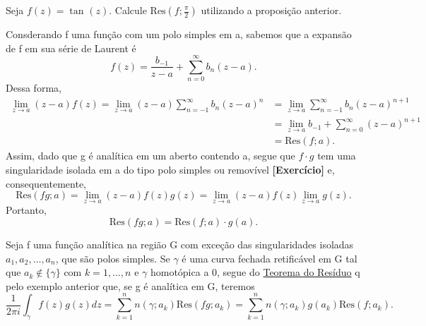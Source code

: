 \documentclass[complex.tex]{subfiles}
\begin{document}
\begin{exer*}
	Seja \(f(z) = \tan^{}{(z)}.\) Calcule \(\mathrm{Res}(f; \frac{\pi }{2})\) utilizando a proposição anterior.
\end{exer*}
\begin{example}
	Consderando f uma função com um polo simples em a, sabemos que a expansão de f em sua série de Laurent é
	\[
		f(z) = \frac{b_{-1}}{z-a} + \sum\limits_{n=0}^{\infty}b_{n}(z-a).
	\]
	Dessa forma,
	\begin{align*}
		\lim_{z\to a}(z-a)f(z) = \lim_{z\to a}(z-a)\sum\limits_{n=-1}^{\infty}b_{n}(z-a)^{n} & = \lim_{z\to a}\sum\limits_{n=-1}^{\infty}b_{n}(z-a)^{n+1}    \\
		                                                                                     & = \lim_{z\to a}b_{-1} + \sum\limits_{n=0}^{\infty}(z-a)^{n+1} \\
		                                                                                     & = \mathrm{Res}(f; a).
	\end{align*}
	Assim, dado que g é analítica em um aberto contendo a, segue que \(f \cdot g\) tem uma singularidade isolada em a do tipo polo simples
	ou removível \textbf{[Exercício]} e, consequentemente,
	\[
		\mathrm{Res}(fg; a) = \lim_{z\to a}(z-a)f(z)g(z) = \lim_{z\to a}(z-a)f(z)\lim_{z\to a}g(z).
	\]
	Portanto,
	\[
		\mathrm{Res}(fg; a) = \mathrm{Res}(f; a)\cdot g(a).
	\]
\end{example}
\begin{example}
	Seja f uma função analítica na região G com exceção das singularidades isoladas \(a_{1}, a_{2}, \dotsc , a_{n}\), que são polos simples.
	Se \(\gamma \) é uma curva fechada retificável em G tal que \(a_{k}\not\in \{\gamma \}\) com \(k=1,\dotsc ,n \) e \(\gamma \) homotópica a 0,
	segue do \hyperlink{residue}{Teorema do Resíduo} q pelo exemplo anterior que, se g é analítica em G, teremos
	\[
		\frac{1}{2\pi i}\int_{\gamma }^{}f(z)g(z)dz = \sum\limits_{k=1}^{n}n(\gamma ; a_{k})\mathrm{Res}(fg; a_{k}) = \sum\limits_{k=1}^{n}n(\gamma ; a_{k})g(a_{k})\mathrm{Res}(f; a_{k}).
	\]
\end{example}
\end{document}
